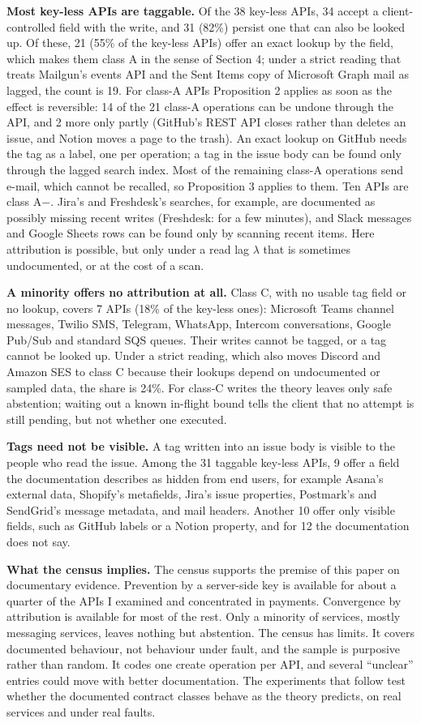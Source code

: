 \documentclass[
  10pt,
]{article}
\begin{document}
\textbf{Most key-less APIs are taggable.} Of the 38 key-less APIs, 34
accept a client-controlled field with the write, and 31 (82\%) persist
one that can also be looked up. Of these, 21 (55\% of the key-less APIs)
offer an exact lookup by the field, which makes them class A in the
sense of Section 4; under a strict reading that treats Mailgun's events
API and the Sent Items copy of Microsoft Graph mail as lagged, the count
is 19. For class-A APIs Proposition 2 applies as soon as the effect is
reversible: 14 of the 21 class-A operations can be undone through the
API, and 2 more only partly (GitHub's REST API closes rather than
deletes an issue, and Notion moves a page to the trash). An exact lookup
on GitHub needs the tag as a label, one per operation; a tag in the
issue body can be found only through the lagged search index. Most of
the remaining class-A operations send e-mail, which cannot be recalled,
so Proposition 3 applies to them. Ten APIs are class A−. Jira's and
Freshdesk's searches, for example, are documented as possibly missing
recent writes (Freshdesk: for a few minutes), and Slack messages and
Google Sheets rows can be found only by scanning recent items. Here
attribution is possible, but only under a read lag \(\lambda\) that is
sometimes undocumented, or at the cost of a scan.

\textbf{A minority offers no attribution at all.} Class C, with no
usable tag field or no lookup, covers 7 APIs (18\% of the key-less
ones): Microsoft Teams channel messages, Twilio SMS, Telegram, WhatsApp,
Intercom conversations, Google Pub/Sub and standard SQS queues. Their
writes cannot be tagged, or a tag cannot be looked up. Under a strict
reading, which also moves Discord and Amazon SES to class C because
their lookups depend on undocumented or sampled data, the share is 24\%.
For class-C writes the theory leaves only safe abstention; waiting out a
known in-flight bound tells the client that no attempt is still pending,
but not whether one executed.

\textbf{Tags need not be visible.} A tag written into an issue body is
visible to the people who read the issue. Among the 31 taggable key-less
APIs, 9 offer a field the documentation describes as hidden from end
users, for example Asana's external data, Shopify's metafields, Jira's
issue properties, Postmark's and SendGrid's message metadata, and mail
headers. Another 10 offer only visible fields, such as GitHub labels or
a Notion property, and for 12 the documentation does not say.

\textbf{What the census implies.} The census supports the premise of
this paper on documentary evidence. Prevention by a server-side key is
available for about a quarter of the APIs I examined and concentrated in
payments. Convergence by attribution is available for most of the rest.
Only a minority of services, mostly messaging services, leaves nothing
but abstention. The census has limits. It covers documented behaviour,
not behaviour under fault, and the sample is purposive rather than
random. It codes one create operation per API, and several ``unclear''
entries could move with better documentation. The experiments that
follow test whether the documented contract classes behave as the theory
predicts, on real services and under real faults.
\end{document}
